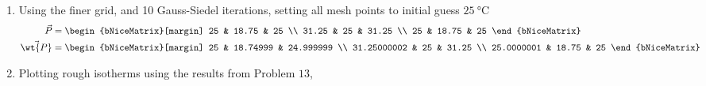 \begin{enumerate}
    \item Using the finer grid, and 10 Gauss-Siedel iterations, setting all mesh points
          to initial guess $ \SI{25}{\celsius} $
          \begin{align}
              \vec{P}      & = \begin{bNiceMatrix}[margin]
                                   25    & 18.75 & 25    \\
                                   31.25 & 25    & 31.25 \\
                                   25    & 18.75 & 25
                               \end{bNiceMatrix}         \\
              \vec{\wt{P}} & = \begin{bNiceMatrix}[margin]
                                   25          & 18.74999 & 24.999999 \\
                                   31.25000002 & 25       & 31.25     \\
                                   25.0000001  & 18.75    & 25
                               \end{bNiceMatrix}
          \end{align}

    \item Plotting rough isotherms using the results from Problem $ 13 $,
          \begin{figure}[H]
              \centering
          \end{figure}


\end{enumerate}

